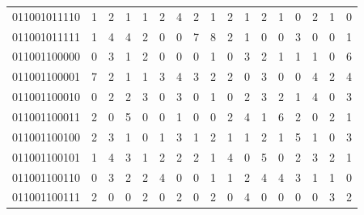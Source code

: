 \documentclass[10pt,a4paper]{article}
\begin{document}
\begin{longtable}{ |c|c|c|c|c|c|c|c|c|c|c|c|c|c|c|c|c| }
    011001011110              & 1                            & 2                                & 1                            & 1                              & 2   & 4   & 2   & 1   & 2   & 1   & 2   & 1   & 0   & 2   & 1   & 0   \\
    011001011111              & 1                            & 4                                & 4                            & 2                              & 0   & 0   & 7   & 8   & 2   & 1   & 0   & 0   & 3   & 0   & 0   & 1   \\
    011001100000              & 0                            & 3                                & 1                            & 2                              & 0   & 0   & 0   & 1   & 0   & 3   & 2   & 1   & 1   & 1   & 0   & 6   \\
    011001100001              & 7                            & 2                                & 1                            & 1                              & 3   & 4   & 3   & 2   & 2   & 0   & 3   & 0   & 0   & 4   & 2   & 4   \\
    011001100010              & 0                            & 2                                & 2                            & 3                              & 0   & 3   & 0   & 1   & 0   & 2   & 3   & 2   & 1   & 4   & 0   & 3   \\
    011001100011              & 2                            & 0                                & 5                            & 0                              & 0   & 1   & 0   & 0   & 2   & 4   & 1   & 6   & 2   & 0   & 2   & 1   \\
    011001100100              & 2                            & 3                                & 1                            & 0                              & 1   & 3   & 1   & 2   & 1   & 1   & 2   & 1   & 5   & 1   & 0   & 3   \\
    011001100101              & 1                            & 4                                & 3                            & 1                              & 2   & 2   & 2   & 1   & 4   & 0   & 5   & 0   & 2   & 3   & 2   & 1   \\
    011001100110              & 0                            & 3                                & 2                            & 2                              & 4   & 0   & 0   & 1   & 1   & 2   & 4   & 4   & 3   & 1   & 1   & 0   \\
    011001100111              & 2                            & 0                                & 0                            & 2                              & 0   & 2   & 0   & 2   & 0   & 4   & 0   & 0   & 0   & 0   & 3   & 2   \\

\end{longtable}
\end{document}
